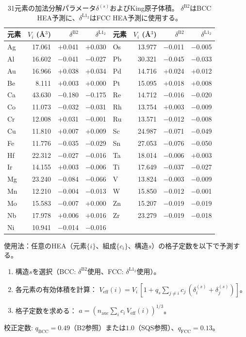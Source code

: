 \documentclass[5p,10pt]{elsarticle}
\begin{document}
\begin{table}[!t]
\centering
\caption{31元素の加法分解パラメータ$\delta^{(s)}$およびKing原子体積。
$\delta^\text{B2}$はBCC HEA予測に、$\delta^{\text{L1}_2}$はFCC HEA予測に使用する。}
\label{tab:delta_params}
\footnotesize
\begin{tabular}{@{}lrrr|lrrr@{}}
\toprule
元素 & $V_i$ (\AA$^3$) & $\delta^\text{B2}$ & $\delta^{\text{L1}_2}$ &
元素 & $V_i$ (\AA$^3$) & $\delta^\text{B2}$ & $\delta^{\text{L1}_2}$ \\
\midrule
Ag &  17.061 & $+$0.041 & $+$0.030 & Os &  13.977 & $-$0.011 & $-$0.005 \\
Al &  16.602 & $-$0.041 & $-$0.027 & Pb &  30.321 & $-$0.045 & $-$0.033 \\
Au &  16.966 & $+$0.038 & $+$0.034 & Pd &  14.716 & $+$0.024 & $+$0.012 \\
Be &   8.111 & $+$0.003 & $+$0.000 & Pt &  15.095 & $+$0.018 & $+$0.008 \\
Ca &  43.630 & $-$0.180 & $-$0.175 & Re &  14.712 & $-$0.016 & $-$0.020 \\
Co &  11.073 & $-$0.032 & $-$0.031 & Rh &  13.754 & $+$0.003 & $-$0.009 \\
Cr &  12.008 & $+$0.031 & $-$0.001 & Ru &  13.571 & $-$0.012 & $-$0.008 \\
Cu &  11.810 & $+$0.007 & $+$0.009 & Sc &  24.987 & $-$0.071 & $-$0.049 \\
Fe &  11.776 & $-$0.035 & $-$0.029 & Sn &  27.053 & $-$0.076 & $-$0.050 \\
Hf &  22.312 & $-$0.027 & $-$0.016 & Ta &  18.014 & $-$0.006 & $+$0.003 \\
Ir &  14.155 & $+$0.003 & $-$0.006 & Ti &  17.649 & $-$0.037 & $-$0.027 \\
Mg &  23.240 & $-$0.084 & $-$0.066 & V  &  13.824 & $-$0.003 & $-$0.009 \\
Mn &  12.210 & $-$0.004 & $-$0.013 & W  &  15.850 & $-$0.012 & $-$0.001 \\
Mo &  15.583 & $-$0.007 & $+$0.000 & Zn &  15.207 & $-$0.019 & $-$0.019 \\
Nb &  17.978 & $+$0.006 & $+$0.016 & Zr &  23.279 & $-$0.019 & $-$0.018 \\
Ni &  10.941 & $-$0.014 & $-$0.016 &    &         &          &          \\
\bottomrule
\end{tabular}
\end{table}

\noindent
使用法：任意のHEA（元素$\{i\}$、組成$\{c_i\}$、構造$s$）の格子定数を以下で予測する。
\begin{enumerate}
  \item 構造$s$を選択（BCC: $\delta^\text{B2}$使用、FCC: $\delta^{\text{L1}_2}$使用）。
  \item 各元素の有効体積を計算：
    $V_\text{eff}(i) = V_i\,[1 + q_s \sum_{j \ne i} c_j\,(\delta_i^{(s)} + \delta_j^{(s)})]$。
  \item 格子定数を求める：
    $a = (n_\text{auc} \sum_i c_i\,V_\text{eff}(i))^{1/3}$。
\end{enumerate}
校正定数: $q_\text{BCC} = 0.49$（B2参照）または$1.0$（SQS参照）、$q_\text{FCC} = 0.13$。
\end{document}
